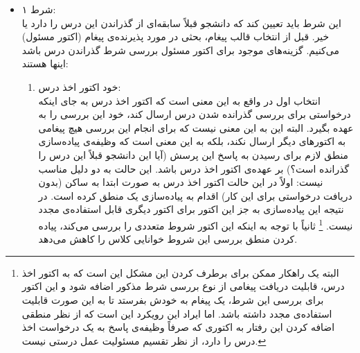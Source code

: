 \begin{itemize}
\item شرط ۱:\\
 این شرط باید تعیین کند که دانشجو قبلاً سابقه‌ای از گذراندن این درس را دارد یا خیر. قبل از انتخاب قالب پیغام، بحثی در مورد پذیرنده‌ی پیغام (اکتور مسئول) می‌کنیم. گزینه‌های موجود برای اکتور مسئول بررسی شرط گذراندن درس باشد اینها هستند:
 \begin{enumerate}
 \item خود اکتور اخذ درس:\\
  انتخاب اول در واقع به این معنی است که اکتور اخذ درس به جای اینکه درخواستی برای بررسی گذرانده شدن درس ارسال کند،‌ خود این بررسی را به عهده بگیرد. البته این به این معنی نیست که برای انجام این بررسی هیچ پیغامی به اکتورهای دیگر ارسال نکند، بلکه به این معنی است که وظیفه‌ی پیاده‌سازی منطق لازم برای رسیدن به پاسخ این پرسش (آیا این دانشجو قبلاً این درس را گذرانده است؟) بر عهده‌ی اکتور اخذ درس باشد. این حالت به دو دلیل مناسب نیست: اولاً در این حالت اکتور اخذ درس به صورت ابتدا به ساکن (بدون دریافت درخواستی برای این کار) اقدام به پیاده‌سازی یک منطق کرده است. در نتیجه این پیاده‌سازی به جز این اکتور برای اکتور دیگری قابل استفاده‌ی مجدد نیست.
 \footnote{  البته یک راهکار ممکن برای برطرف کردن این مشکل این است که به اکتور اخذ درس، قابلیت دریافت پیغامی از نوع بررسی شرط مذکور اضافه شود و این اکتور برای بررسی این شرط، یک پیغام به خودش بفرستد تا به این صورت قابلیت استفاده‌ی مجدد داشته باشد. اما ایراد این رویکرد این است که از نظر منطقی اضافه کردن این رفتار به اکتوری که صرفاً وظیفه‌ی پاسخ به یک درخواست اخذ درس را دارد، از نظر تقسیم مسئولیت عمل درستی نیست.}
  ثانیاً با توجه به اینکه این اکتور شروط متعددی را بررسی می‌کند، پیاده کردن منطق بررسی این شروط خوانایی کلاس را کاهش می‌دهد. 
 

\end{enumerate}
\end{itemize}
